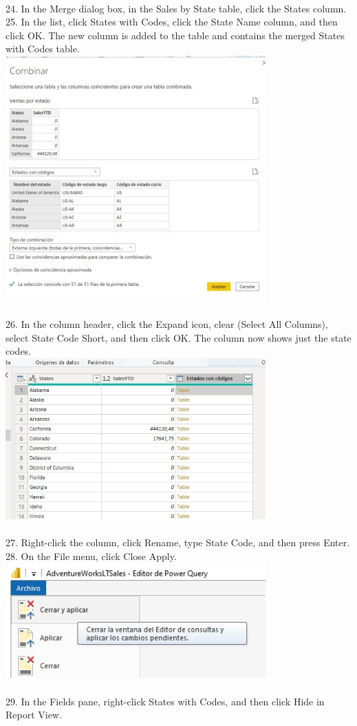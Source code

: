 \documentclass[preprint,12pt]{elsarticle}
\begin{document}
\begin{itemize}
		 		\\ 24. In the Merge dialog box, in the Sales by State table, click the States column.
		 		\\ 25. In the list, click States with Codes, click the State Name column, and then click OK. The new column is
		 		added to the table and contains the merged States with Codes table.
		 		\\ \includegraphics[width=10cm]{./IMAGENES/3.25} \\
		 		\\ 26. In the column header, click the Expand icon, clear (Select All Columns), select State Code Short,
		 		and then click OK. The column now shows just the state codes.
		 		\\ \includegraphics[width=10cm]{./IMAGENES/3.26} \\
		 		\\ 27. Right-click the column, click Rename, type State Code, and then press Enter.
		 		\\ 28. On the File menu, click Close  Apply.
		 		\\ \includegraphics[width=10cm]{./IMAGENES/3.28} \\
		 		\\ 29. In the Fields pane, right-click States with Codes, and then click Hide in Report View.
		 	

\end{itemize}
\end{document}
